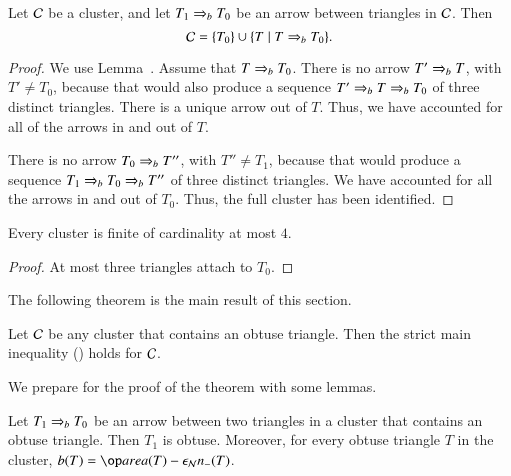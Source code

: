 \begin{theorem}
  Let $\mathcal C$ be a cluster, and let $T_1\Rightarrow_{b} T_0$ be an
  arrow between triangles in $\mathcal C$.
  Then 
  \begin{equation}\libel{eqn:c-weak}
  \C = \{T_0\}\cup \{T \mid T\rab T_0\}.
  \end{equation}
\end{theorem}

\begin{proof}  
  We use Lemma~.  Assume that $T\Rightarrow_{b} T_0$.  There
  is no arrow $T'\Rightarrow_{b} T$, with $T'\ne T_0$, because that would also
  produce a sequence $T' \Rightarrow_{b} T \Rightarrow_{b} T_0$ of three distinct triangles.
  There is a unique arrow out of $T$.  Thus, we have accounted for all
  of the arrows in and out of $T$.

  There is no arrow $T_0\Rightarrow_{b} T''$, with $T''\ne T_1$, because that
  would produce a sequence $T_1\Rightarrow_{b} T_0\Rightarrow_{b} T''$ of  three 
  distinct triangles.  We have accounted for all the arrows in and
  out of $T_0$.  Thus, the full cluster has been identified.
\end{proof}

\begin{corollary}
  Every cluster is finite of cardinality at most $4$.
\end{corollary}

\begin{proof} At most three triangles attach to $T_0$.
\end{proof}

The following theorem is the main result of this
section.

\begin{theorem}  
  Let $\mathcal C$ be any cluster that contains an obtuse triangle.  Then 
   the strict main inequality ()
  holds for $\mathcal C$.
\end{theorem}

We prepare for the proof of the theorem with some lemmas.

\begin{lemma}  
  Let $T_1\Rightarrow_{b} T_0$ be an
  arrow between two triangles in a cluster that contains an obtuse
  triangle.  Then $T_1$ is obtuse.  Moreover, for every obtuse
  triangle $T$ in the cluster, $b(T) = \area(T) -\epsN n_-(T)$.
\end{lemma}


